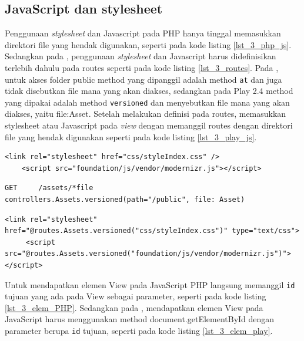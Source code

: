 \subsection{JavaScript dan stylesheet}
Penggunaan \textit{stylesheet} dan Javascript pada PHP hanya tinggal memasukkan direktori file yang hendak digunakan, seperti pada kode listing \ref{lst_3_php_js}. Sedangkan pada \play, penggunaan \textit{stylesheet} dan Javascript harus didefinisikan terlebih dahulu pada routes seperti pada kode listing \ref{lst_3_routes}. Pada \cite{playforjava}, untuk akses folder public method yang dipanggil adalah method \verb!at! dan juga tidak disebutkan file mana yang akan diakses, sedangkan pada Play 2.4 method yang dipakai adalah method \verb!versioned! dan menyebutkan file mana yang akan diakses, yaitu file:Asset. Setelah melakukan definisi pada routes, memasukkan stylesheet atau Javascript pada \textit{view} dengan memanggil routes dengan direktori file yang hendak digunakan seperti pada kode listing \ref{lst_3_play_js}. 

\begin{lstlisting}[caption=Penggunaan \textit{stylesheet} dan Javascript pada PHP,label = {lst_3_php_js}]
	<link rel="stylesheet" href="css/styleIndex.css" />
	<script src="foundation/js/vendor/modernizr.js"></script>
\end{lstlisting}

\begin{lstlisting}[caption=Routes untuk penggunaan \textit{stylesheet} dan Javascript,label = {lst_3_routes}]
	GET     /assets/*file               controllers.Assets.versioned(path="/public", file: Asset)
\end{lstlisting}

\begin{lstlisting}[caption=Penggunaan \textit{stylesheet} dan Javascript pada \play,label = {lst_3_play_js}]
	 <link rel="stylesheet" href="@routes.Assets.versioned("css/styleIndex.css")" type="text/css">
	 <script src="@routes.Assets.versioned("foundation/js/vendor/modernizr.js")"></script>
\end{lstlisting}

Untuk mendapatkan elemen View pada JavaScript PHP langsung memanggil \verb!id! tujuan yang ada pada View sebagai parameter, seperti pada kode listing \ref{lst_3_elem_PHP}. Sedangkan pada \play, mendapatkan elemen View pada JavaScript harus menggunakan method document.getElementById dengan parameter berupa \verb!id! tujuan, seperti pada kode listing \ref{lst_3_elem_play}.

